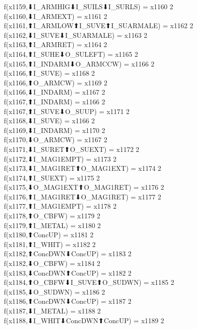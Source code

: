 f(x1159,⬇I_ARMHIG⬇I_SUILS⬇I_SURLS) = x1160 {2} \\
f(x1160,⬇I_ARMEXT) = x1161 {2} \\
f(x1161,⬆I_ARMLOW⬆I_SUVE⬆I_SUARMALE) = x1162 {2} \\
f(x1162,⬇I_SUVE⬇I_SUARMALE) = x1163 {2} \\
f(x1163,⬆I_ARMRET) = x1164 {2} \\
f(x1164,⬆I_SUHE⬇O_SULEFT) = x1165 {2} \\
f(x1165,⬆I_INDARM⬇O_ARMCCW) = x1166 {2} \\
f(x1166,⬆I_SUVE) = x1168 {2} \\
f(x1166,⬆O_ARMCW) = x1169 {2} \\
f(x1166,⬇I_INDARM) = x1167 {2} \\
f(x1167,⬆I_INDARM) = x1166 {2} \\
f(x1167,⬆I_SUVE⬇O_SUUP) = x1171 {2} \\
f(x1168,⬇I_SUVE) = x1166 {2} \\
f(x1169,⬇I_INDARM) = x1170 {2} \\
f(x1170,⬇O_ARMCW) = x1167 {2} \\
f(x1171,⬇I_SURET⬆O_SUEXT) = x1172 {2} \\
f(x1172,⬇I_MAG1EMPT) = x1173 {2} \\
f(x1173,⬇I_MAG1RET⬆O_MAG1EXT) = x1174 {2} \\
f(x1174,⬆I_SUEXT) = x1175 {2} \\
f(x1175,⬇O_MAG1EXT⬆O_MAG1RET) = x1176 {2} \\
f(x1176,⬆I_MAG1RET⬇O_MAG1RET) = x1177 {2} \\
f(x1177,⬆I_MAG1EMPT) = x1178 {2} \\
f(x1178,⬆O_CBFW) = x1179 {2} \\
f(x1179,⬆I_METAL) = x1180 {2} \\
f(x1180,⬆ConcUP) = x1181 {2} \\
f(x1181,⬆I_WHIT) = x1182 {2} \\
f(x1182,⬆ConcDWN⬇ConcUP) = x1183 {2} \\
f(x1182,⬇O_CBFW) = x1184 {2} \\
f(x1183,⬇ConcDWN⬆ConcUP) = x1182 {2} \\
f(x1184,⬆O_CBFW⬇I_SUVE⬆O_SUDWN) = x1185 {2} \\
f(x1185,⬇O_SUDWN) = x1186 {2} \\
f(x1186,⬆ConcDWN⬇ConcUP) = x1187 {2} \\
f(x1187,⬇I_METAL) = x1188 {2} \\
f(x1188,⬇I_WHIT⬇ConcDWN⬆ConcUP) = x1189 {2} \\
